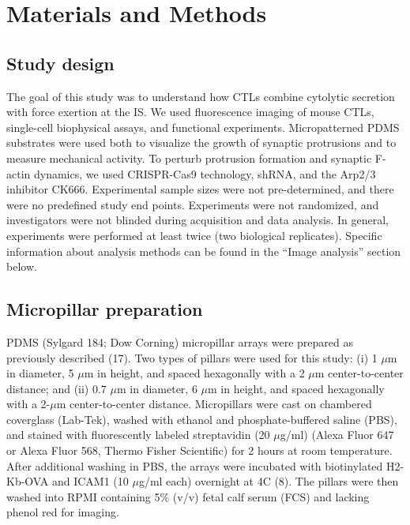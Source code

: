 \section{Materials and Methods}

\subsection{Study design}
The goal of this study was to understand how CTLs combine cytolytic secretion with force exertion at the IS. We used fluorescence imaging of mouse CTLs, single-cell biophysical assays, and functional experiments. Micropatterned PDMS substrates were used both to visualize the growth of synaptic protrusions and to measure mechanical activity. To perturb protrusion formation and synaptic F-actin dynamics, we used CRISPR-Cas9 technology, shRNA, and the Arp2/3 inhibitor CK666. Experimental sample sizes were not pre-determined, and there were no predefined study end points. Experiments were not randomized, and investigators were not blinded during acquisition and data analysis. In general, experiments were performed at least twice (two biological replicates). Specific information about analysis methods can be found in the “Image analysis” section below.

\subsection{Micropillar preparation}
PDMS (Sylgard 184; Dow Corning) micropillar arrays were prepared as previously described (17). Two types of pillars were used for this study: (i) 1 $\mu$m in diameter, 5 $\mu$m in height, and spaced hexagonally with a 2 $\mu$m center-to-center distance; and (ii) 0.7 $\mu$m in diameter, 6 $\mu$m in height, and spaced hexagonally with a 2-$\mu$m center-to-center distance. Micropillars were cast on chambered coverglass (Lab-Tek), washed with ethanol and phosphate-buffered saline (PBS), and stained with fluorescently labeled streptavidin (20 $\mu$g/ml) (Alexa Fluor 647 or Alexa Fluor 568, Thermo Fisher Scientific) for 2 hours at room temperature. After additional washing in PBS, the arrays were incubated with biotinylated H2-Kb-OVA and ICAM1 (10 $\mu$g/ml each) overnight at 4\degree C (8). The pillars were then washed into RPMI containing 5\% (v/v) fetal calf serum (FCS) and lacking phenol red for imaging.

